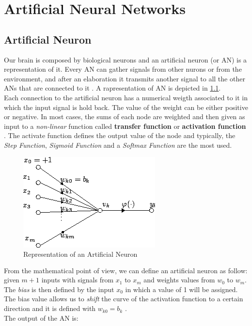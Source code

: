 \chapter{Artificial Neural Networks}
\section{Artificial Neuron}
Our brain is composed by biological neurons and an artificial neuron (or AN) is a representation of it. Every AN can gather signals from other nurons or from the environment, and after an elaboration it transmits another signal to all the other ANs that are connected to it \cite{engelbrecht2007computational}. A rapresentation of AN is depicted in \ref{fig:artificial_neuron}. \\
Each connection to the artificial neuron has a numerical weigth associated to it in which the input signal is hold back. The value of the weight can be either positive or negative. In most cases, the sums of each node are weighted and then given as input to a \textit{non-linear} function called \textbf{transfer function} or \textbf{activation function} \cite{artificial_neuron_wiki}. The activate function defines the output value of the node and typically, the \textit{Step Function}, \textit{Sigmoid Function} and a \textit{Softmax Function} are the most used.

\begin{figure}[!ht]
    \centering
    \includegraphics[scale=0.5]{Figures/artificial_neuron.png}
    \caption{Representation of an Artificial Neuron \cite{artificial_neuron_wiki}}
    \label{fig:artificial_neuron}
\end{figure}

\noindent From the mathematical point of view, we can define an artificial neuron as follow: \\
given $m+1$ inputs with signals from $x_1$ to $x_m$ and weights values from $w_0$ to $w_m$. The \textit{bias} is then defined by the input $x_0$ in which a value of 1 will be assigned. The bias value allows us to \textit{shift} the curve of the activation function to a certain direction and it is defined with $w_{k0} = b_k$ \cite{artificial_neuron_wiki}. \\
The output of the AN is:

